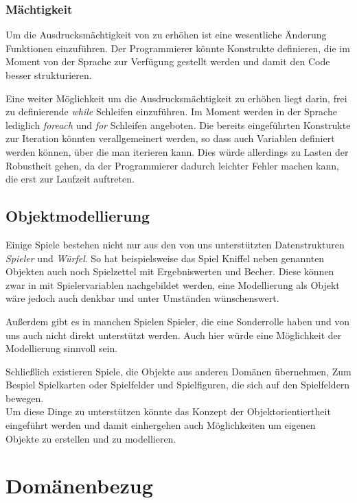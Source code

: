 \subsubsection{Mächtigkeit} %
\label{ssub:machtigkeit}
Um die Ausdrucksmächtigkeit von \dg zu erhöhen ist eine wesentliche Änderung Funktionen einzuführen. Der Programmierer könnte Konstrukte definieren, die im Moment von der Sprache zur Verfügung gestellt werden und damit den Code besser strukturieren. 

Eine weiter Möglichkeit um die Ausdrucksmächtigkeit zu erhöhen liegt darin, frei zu definierende \emph{while} Schleifen einzuführen. Im Moment werden in der Sprache lediglich \emph{foreach} und \emph{for} Schleifen angeboten. Die bereits eingeführten Konstrukte zur Iteration könnten verallgemeinert werden, so dass auch Variablen definiert werden können, über die man iterieren kann. Dies würde allerdings zu Lasten der Robustheit gehen, da der Programmierer dadurch leichter Fehler machen kann, die erst zur Laufzeit auftreten.

\subsection{Objektmodellierung} %
\label{ssub:objektmodellierung}
Einige Spiele bestehen nicht nur aus den von uns unterstützten Datenstrukturen \emph{Spieler} und \emph{Würfel}. So hat beispielsweise das Spiel Kniffel neben genannten Objekten auch noch Spielzettel mit Ergebniswerten und Becher. Diese können zwar in \dg mit Spielervariablen nachgebildet werden, eine Modellierung als Objekt wäre jedoch auch denkbar und unter Umständen wünschenswert.

Außerdem gibt es in manchen Spielen Spieler, die eine Sonderrolle haben und von uns auch nicht direkt unterstützt werden. Auch hier würde eine Möglichkeit der Modellierung sinnvoll sein.

Schließlich existieren Spiele, die Objekte aus anderen Domänen übernehmen, Zum Bespiel Spielkarten oder Spielfelder und Spielfiguren, die sich auf den Spielfeldern bewegen.\\

Um diese Dinge zu unterstützen könnte das Konzept der Objektorientiertheit eingeführt werden und damit einhergehen auch Möglichkeiten um eigenen Objekte zu erstellen und zu modellieren.




\section{Domänenbezug} %
\label{sec:domanenbezug}

